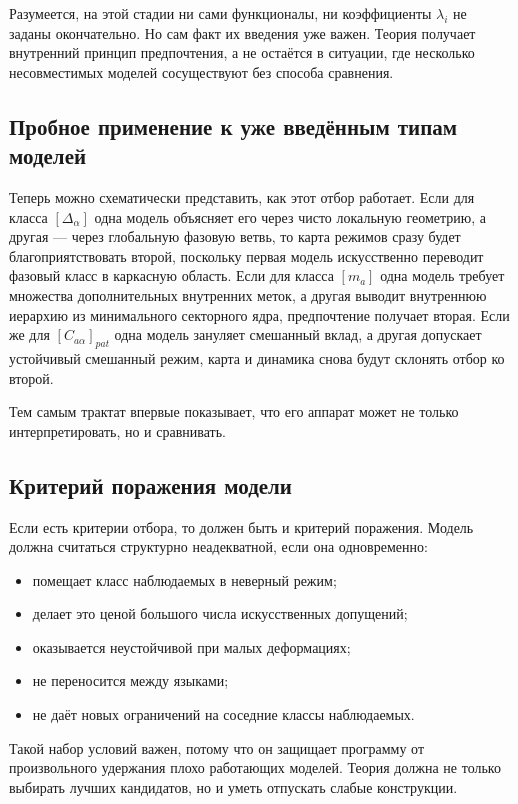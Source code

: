 \documentclass[12pt,a4paper]{article}
\begin{document}
Разумеется, на этой стадии ни сами функционалы, ни коэффициенты \(\lambda_i\) не заданы окончательно. Но сам факт их введения уже важен. Теория получает внутренний принцип предпочтения, а не остаётся в ситуации, где несколько несовместимых моделей сосуществуют без способа сравнения.

\subsection{Пробное применение к уже введённым типам моделей}

Теперь можно схематически представить, как этот отбор работает. Если для класса \([\Delta_{\alpha}]\) одна модель объясняет его через чисто локальную геометрию, а другая --- через глобальную фазовую ветвь, то карта режимов сразу будет благоприятствовать второй, поскольку первая модель искусственно переводит фазовый класс в каркасную область. Если для класса \([m_a]\) одна модель требует множества дополнительных внутренних меток, а другая выводит внутреннюю иерархию из минимального секторного ядра, предпочтение получает вторая. Если же для \([C_{a\alpha}]_{pat}\) одна модель зануляет смешанный вклад, а другая допускает устойчивый смешанный режим, карта и динамика снова будут склонять отбор ко второй.

Тем самым трактат впервые показывает, что его аппарат может не только интерпретировать, но и сравнивать.

\subsection{Критерий поражения модели}

Если есть критерии отбора, то должен быть и критерий поражения. Модель должна считаться структурно неадекватной, если она одновременно:
\begin{itemize}
    \item помещает класс наблюдаемых в неверный режим;
    \item делает это ценой большого числа искусственных допущений;
    \item оказывается неустойчивой при малых деформациях;
    \item не переносится между языками;
    \item не даёт новых ограничений на соседние классы наблюдаемых.
\end{itemize}

Такой набор условий важен, потому что он защищает программу от произвольного удержания плохо работающих моделей. Теория должна не только выбирать лучших кандидатов, но и уметь отпускать слабые конструкции.
\end{document}
